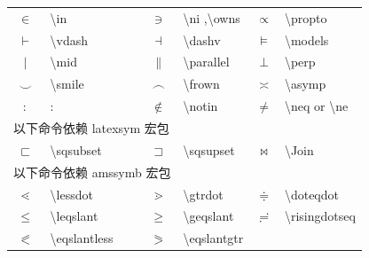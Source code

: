 \documentclass[a4paper]{ctexart}
\begin{document}
\begin{table}[H]
\begin{tabular}{clclcl}
            $\in$           & \textbackslash in         & $\ni$         & \textbackslash ni ,\textbackslash owns    &
            $\propto$       & \textbackslash propto                                                                 \\
            $\vdash$        & \textbackslash vdash      & $\dashv$      & \textbackslash dashv                      &
            $\models$       & \textbackslash models                                                                 \\
            $\mid$          & \textbackslash mid        & $\parallel$   & \textbackslash parallel                   &
            $\perp$         & \textbackslash perp                                                                   \\
            $\smile$        & \textbackslash smile      & $\frown$      & \textbackslash frown                      &
            $\asymp$        & \textbackslash asymp                                                                  \\
            $:$             & :                         & $\notin$      & \textbackslash notin                      &
            $\neq$          & \textbackslash neq or \textbackslash ne                                               \\
            \midrule
            \multicolumn{3}{l}{以下命令依赖 latexsym 宏包}\\
            $\sqsubset$     & \textbackslash sqsubset   & $\sqsupset$   & \textbackslash sqsupset                   & 
            $\Join$         & \textbackslash Join                                                                   \\
            \midrule 
            \multicolumn{3}{l}{以下命令依赖 amssymb 宏包}\\
            $\lessdot$              & \textbackslash lessdot            & $\gtrdot$         & \textbackslash gtrdot         & 
            $\doteqdot$             & \textbackslash doteqdot                                                               \\
            $\leqslant$             & \textbackslash leqslant           & $\geqslant$       & \textbackslash geqslant       &
            $\risingdotseq$         & \textbackslash risingdotseq                                                           \\
            $\eqslantless$          & \textbackslash eqslantless        & $\eqslantgtr$     & \textbackslash eqslantgtr     &

\end{tabular}
\end{table}
\end{document}
